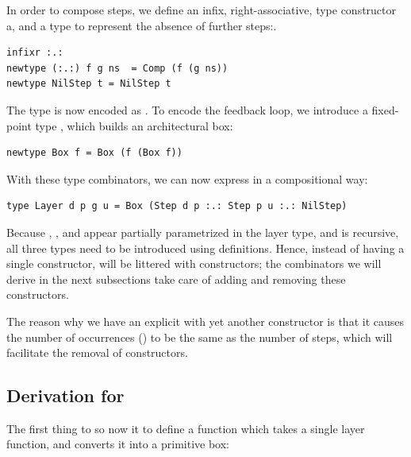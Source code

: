 \documentclass{llncs}
\begin{document}
In order to compose steps, we define an infix, right-associative, type constructor  a, and a type to represent the absence of further steps:.

\begin{small}
\begin{verbatim}
infixr :.:
newtype (:.:) f g ns  = Comp (f (g ns))
newtype NilStep t = NilStep t
\end{verbatim}
\end{small}

The type  is now encoded as
. To encode the feedback loop, we introduce a fixed-point type , which builds an architectural box:

\begin{small}
\begin{verbatim}
newtype Box f = Box (f (Box f))
\end{verbatim}
\end{small}

With these type combinators, we can now express  in a compositional way:

\begin{small}
\begin{verbatim}
type Layer d p g u = Box (Step d p :.: Step p u :.: NilStep)
\end{verbatim}
\end{small}

Because , , and   appear partially parametrized in the layer type, and  is recursive, all three types need to be introduced using  definitions. Hence, instead of having a single  constructor,  will be littered with constructors; the combinators we will derive in the next subsections take care of adding and removing these constructors.

The reason why we have an explicit  with yet another constructor is that it causes the number of occurrences () to be the same as the number of steps, which will facilitate the removal of  constructors.
\subsection{Derivation for }\label{subsect:liftDerivation}

The first thing to so now it to define a function  which takes a single layer function, and converts it into a primitive box:
\end{document}
